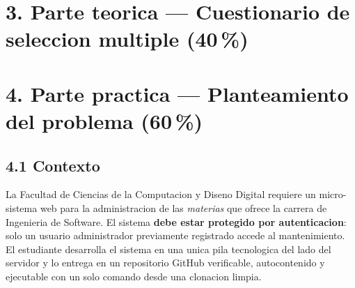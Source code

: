 \documentclass[10pt,a4paper]{article}
\begin{document}
\section*{3. Parte teorica --- Cuestionario de seleccion multiple (40\,\%)}
\noindent{}

\section*{4. Parte practica --- Planteamiento del problema (60\,\%)}
\subsection*{4.1 Contexto}
La Facultad de Ciencias de la Computacion y Diseno Digital requiere un micro-sistema web para la administracion de las \emph{materias} que ofrece la carrera de Ingenieria de Software. El sistema \textbf{debe estar protegido por autenticacion}: solo un usuario administrador previamente registrado accede al mantenimiento. El estudiante desarrolla el sistema en una unica pila tecnologica del lado del servidor y lo entrega en un repositorio GitHub verificable, autocontenido y ejecutable con un solo comando desde una clonacion limpia.
\end{document}
